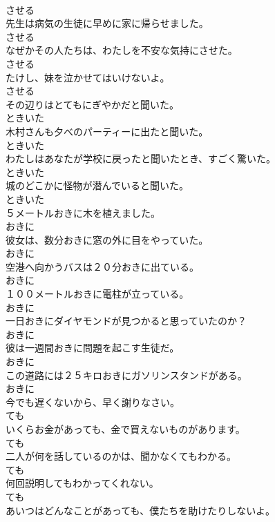 \documentclass[8pt]{extreport}
\begin{document}
\begin{CJK}{UTF8}{min}
\\	させる
\\	先生は病気の生徒に早めに家に帰らせました。	
\\	させる
\\	なぜかその人たちは、わたしを不安な気持にさせた。	
\\	させる
\\	たけし、妹を泣かせてはいけないよ。	
\\	させる
\\	その辺りはとてもにぎやかだと聞いた。	
\\	ときいた
\\	木村さんも夕べのパーティーに出たと聞いた。	
\\	ときいた
\\	わたしはあなたが学校に戻ったと聞いたとき、すごく驚いた。	
\\	ときいた
\\	城のどこかに怪物が潜んでいると聞いた。	
\\	ときいた
\\	５メートルおきに木を植えました。	
\\	おきに
\\	彼女は、数分おきに窓の外に目をやっていた。	
\\	おきに
\\	空港へ向かうバスは２０分おきに出ている。	
\\	おきに
\\	１００メートルおきに電柱が立っている。	
\\	おきに
\\	一日おきにダイヤモンドが見つかると思っていたのか？	
\\	おきに
\\	彼は一週間おきに問題を起こす生徒だ。	
\\	おきに
\\	この道路には２５キロおきにガソリンスタンドがある。	
\\	おきに
\\	今でも遅くないから、早く謝りなさい。	
\\	ても
\\	いくらお金があっても、金で買えないものがあります。	
\\	ても
\\	二人が何を話しているのかは、聞かなくてもわかる。	
\\	ても
\\	何回説明してもわかってくれない。	
\\	ても
\\	あいつはどんなことがあっても、僕たちを助けたりしないよ。	

\end{CJK}
\end{document}
